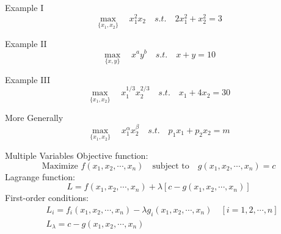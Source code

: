 \documentclass{./../../Latex/teaching_slides}
\begin{document}
\begin{frame}{Example I}
\vspace{-2em}
$$ \max_{\{x_1,x_2\}} \quad x_1^2x_2 \quad s.t. \quad 2x_1^2 + x_2^2 = 3$$
\end{frame}

\begin{frame}{Example II}
\vspace{-2em}
$$ \max_{\{x,y\}} \quad x^a y^b \quad s.t. \quad x+y=10$$
\end{frame}

\begin{frame}{Example III}
\vspace{-1.5em}
$$ \max_{\{x_1,x_2\}} \quad x_1^{1/3} x_2^{2/3} \quad s.t. \quad x_1 + 4 x_2 = 30 $$
\end{frame}

\begin{frame}{More Generally}
\vspace{-1.5em}
$$ \max_{\{x_1,x_2\}} \quad x_1^{\alpha} x_2^{\beta} \quad s.t. \quad p_1 x_1 + p_2 x_2 = m $$
\end{frame}

\begin{frame}{Multiple Variables}
Objective function:
$$ \text{Maximize } f\left(x_{1}, x_{2}, \cdots, x_{n}\right) \quad \text{subject to} \quad g\left(x_{1}, x_{2}, \cdots, x_{n}\right)=c 
$$
Lagrange function:
$$
L=f\left(x_{1}, x_{2}, \cdots, x_{n}\right)+\lambda\left[c-g\left(x_{1}, x_{2}, \cdots, x_{n}\right)\right]
$$
First-order conditions:
$$
\begin{aligned}
&L_{i}=f_{i}\left(x_{1}, x_{2}, \cdots, x_{n}\right)-\lambda g_{i}\left(x_{1}, x_{2}, \cdots, x_{n}\right) \quad[i=1,2, \cdots, n] \\
&L_{\lambda}=c-g\left(x_{1}, x_{2}, \cdots, x_{n}\right) 
\end{aligned}
$$
\end{frame}
\end{document}
